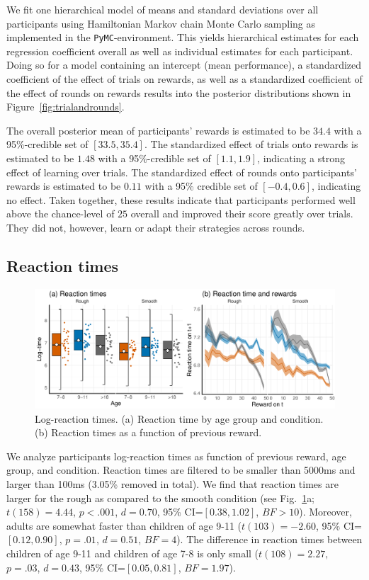 We fit one hierarchical model of means and standard deviations over all participants using Hamiltonian Markov chain Monte Carlo sampling as implemented in the \texttt{PyMC}-environment. This yields hierarchical estimates for each regression coefficient overall as well as individual estimates for each participant. Doing so for a model containing an intercept (mean performance), a standardized coefficient of the effect of trials on rewards, as well as a standardized coefficient of the effect of rounds on rewards results into the posterior distributions shown in Figure~\ref{fig:trialandrounds}. 

The overall posterior mean of participants' rewards is estimated to be $34.4$ with a 95\%-credible set of $[33.5,35.4]$. The standardized effect of trials onto rewards is estimated to be $1.48$ with a 95\%-credible set of $[1.1,1.9]$, indicating a strong effect of learning over trials. The standardized effect of rounds onto participants' rewards is estimated to be $0.11$ with a 95\% credible set of $[-0.4,0.6]$, indicating no effect. Taken together, these results indicate that participants performed well above the chance-level of $25$ overall and improved their score greatly over trials. They did not, however, learn or adapt their strategies across rounds. 




\subsection*{Reaction times}
\begin{figure}[ht!]
\centering
\includegraphics[width=0.8\linewidth]{reactiontimes.pdf}
\caption{Log-reaction times. (a) Reaction time by age group and condition. (b) Reaction times as a function of previous reward.} 
\label{fig:rts}
\vspace{-1mm}
\end{figure}
We analyze participants log-reaction times as function of previous reward, age group, and condition. Reaction times are filtered to be smaller than 5000ms and larger than 100ms (3.05\% removed in total). We find that reaction times are larger for the rough as compared to the smooth condition (see Fig.~\ref{fig:rts}a; $t(158)=4.44$, $p<.001$, $d= 0.70$, 95\% CI=$[0.38, 1.02]$, $BF>10$). Moreover, adults are somewhat faster than children of age 9-11 ($t(103)=-2.60$, 95\% CI=$[0.12, 0.90]$, $p=.01$, $d=0.51$, $BF=4$). The difference in reaction times between children of age 9-11 and children of age 7-8 is only small ($t(108)=2.27,$ $p=.03$, $d=0.43$, 95\% CI=$[0.05, 0.81]$, $BF= 1.97$). 

